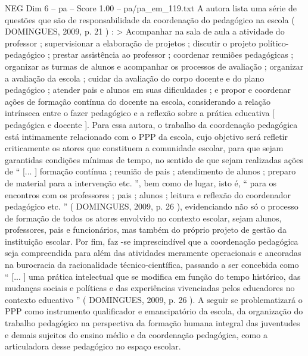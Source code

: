 \begin{textsample}{NEG Dim 6 – pa – Score 1.00 – pa/pa\_em\_119.txt}
A autora lista uma série de questões que são de responsabilidade da coordenação do pedagógico na escola ( DOMINGUES, 2009, p. 21 ) : > Acompanhar na sala de aula a atividade do professor ; supervisionar a elaboração de projetos ; discutir o projeto político-pedagógico ; prestar assistência ao professor ; coordenar reuniões pedagógicas ; organizar as turmas de alunos e acompanhar os processos de avaliação ; organizar a avaliação da escola ; cuidar da avaliação do corpo docente e do plano pedagógico ; atender pais e alunos em suas dificuldades ; e propor e coordenar ações de formação contínua do docente na escola, considerando a relação intrínseca entre o fazer pedagógico e a reflexão sobre a prática educativa [ pedagógica e docente ].
Para essa autora, o trabalho da coordenação pedagógica está intimamente relacionado com o PPP da escola, cujo objetivo será refletir criticamente os atores que constituem a comunidade escolar, para que sejam garantidas condições mínimas de tempo, no sentido de que sejam realizadas ações de “ [... ] formação contínua ; reunião de pais ; atendimento de alunos ; preparo de material para a intervenção etc. ”, bem como de lugar, isto é, “ para os encontros com os professores ; pais ; alunos ; leitura e reflexão do coordenador pedagógico etc. ” ( DOMINGUES, 2009, p. 26 ), evidenciando não só o processo de formação de todos os atores envolvido no contexto escolar, sejam alunos, professores, pais e funcionários, mas também do próprio projeto de gestão da instituição escolar.
Por fim, faz -se imprescindível que a coordenação pedagógica seja compreendida para além das atividades meramente operacionais e ancoradas na burocracia da racionalidade técnico-científica, passando a ser concebida como “ [... ] uma prática intelectual que se modifica em função do tempo histórico, das mudanças sociais e políticas e das experiências vivenciadas pelos educadores no contexto educativo ” ( DOMINGUES, 2009, p. 26 ).
A seguir se problematizará o PPP como instrumento qualificador e emancipatório da escola, da organização do trabalho pedagógico na perspectiva da formação humana integral das juventudes e demais sujeitos do ensino médio e da coordenação pedagógica, como a articuladora desse pedagógico no espaço escolar.

\end{textsample}
